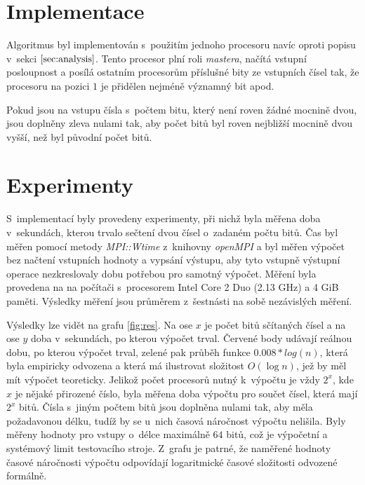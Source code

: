 \documentclass[a4paper, 12pt]{article}
\begin{document}
\section{Implementace}
\label{sec:impl}
Algoritmus byl implementován s~použitím jednoho procesoru navíc oproti popisu v~sekci $\ref{sec:analysis}$.
Tento procesor plní roli \emph{mastera}, načítá vstupní posloupnost a posílá ostatním procesorům příslušné bity
ze vstupních čísel tak, že procesoru na pozici $1$ je přidělen nejméně významný bit apod.

Pokud jsou na vstupu čísla s~počtem bitu, který není roven žádné mocnině dvou, jsou doplněny zleva nulami tak,
aby počet bitů byl roven nejbližší mocnině dvou vyšší, než byl původní počet bitů.

\section{Experimenty}
\label{sec:exprmts}
S~implementací byly provedeny experimenty, při nichž byla měřena doba v~sekundách, kterou
trvalo sečtení dvou čísel o~zadaném počtu bitů.
Čas byl měřen pomocí metody \emph{MPI::Wtime} z~knihovny \emph{openMPI}
a byl měřen výpočet bez načtení vstupních hodnoty a vypsání výstupu,
aby tyto vstupně výstupní operace nezkreslovaly dobu potřebou pro samotný výpočet.
Měření byla provedena na na počítači s~procesorem Intel Core 2 Duo (2.13 GHz) a 4 GiB paměti.
Výsledky měření jsou průměrem z~šestnásti na sobě nezávislých měření.

Výsledky lze vidět na grafu \ref{fig:res}.
Na ose $x$ je počet bitů sčítaných čísel a na ose $y$ doba v~sekundách,
po kterou výpočet trval.
Červené body udávají reálnou dobu, po kterou výpočet trval, zelené
pak průběh funkce $0.008*log(n)$, která byla empiricky odvozena
a která má ilustrovat složitost $O(\log{n})$, jež by měl mít výpočet teoreticky.
Jelikož počet procesorů nutný k~výpočtu je vždy $2^x$, kde $x$ je nějaké přirozené číslo,
byla měřena doba výpočtu pro součet čísel, která mají $2^x$ bitů.
Čísla s~jiným počtem bitů jsou doplněna nulami tak, aby měla požadavonou délku, tudíž
by se u~nich časová náročnost výpočtu nelišila.
Byly měřeny hodnoty pro vstupy o~délce maximálně $64$ bitů, což je výpočetní a systémový limit testovacího
stroje.
Z~grafu je patrné, že naměřené hodnoty časové náročnosti výpočtu odpovídají logaritmické
časové složitosti odvozené formálně.
\end{document}
